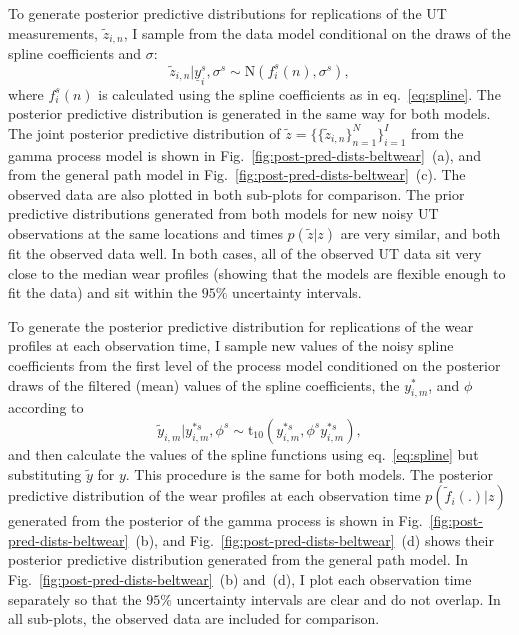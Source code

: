 To generate posterior predictive distributions for replications of the UT measurements, $\tilde{z}_{i,n}$, I sample from the data model conditional on the draws of the spline coefficients and $\sigma$:
\begin{equation}
  \tilde{z}_{i, n}|\underline{y}_{i}^s, \sigma^s \sim \mbox{N}\left(f^s_i(n), \sigma^s\right),
\end{equation}
where $f^s_i(n)$ is calculated using the spline coefficients as in eq.~\ref{eq:spline}. The posterior predictive distribution is generated in the same way for both models. The joint posterior predictive distribution of $\tilde{z} = \{\{\tilde{z}_{i,n}\}^N_{n = 1}\}^I_{i = 1}$ from the gamma process model is shown in Fig.~\ref{fig:post-pred-dists-beltwear}~(a), and from the general path model in Fig.~\ref{fig:post-pred-dists-beltwear}~(c). The observed data are also plotted in both sub-plots for comparison. The prior predictive distributions generated from both models for new noisy UT observations at the same locations and times $p(\tilde{z}|z)$ are very similar, and both fit the observed data well. In both cases, all of the observed UT data sit very close to the median wear profiles (showing that the models are flexible enough to fit the data) and sit within the $95\%$ uncertainty intervals. 

To generate the posterior predictive distribution for replications of the wear profiles at each observation time, I sample new values of the noisy spline coefficients from the first level of the process model conditioned on the posterior draws of the filtered (mean) values of the spline coefficients, the $y^{*}_{i, m}$, and $\phi$ according to
\begin{equation}
  \tilde{y}_{i, m}|y^{*s}_{i, m}, \phi^s \sim \mbox{t}_{10} (y^{*s}_{i, m}, \phi^s y^{*s}_{i, m}),
\end{equation}
and then calculate the values of the spline functions using eq.~\eqref{eq:spline} but substituting $\tilde{y}$ for $y$. This procedure is the same for both models. The posterior predictive distribution of the wear profiles at each observation time $p(\tilde{f}_i(.)|z)$ generated from the posterior of the gamma process is shown in Fig.~\ref{fig:post-pred-dists-beltwear}~(b), and Fig.~\ref{fig:post-pred-dists-beltwear}~(d) shows their posterior predictive distribution generated from the general path model. In Fig.~\ref{fig:post-pred-dists-beltwear}~(b) and~(d), I plot each observation time separately so that the $95\%$ uncertainty intervals are clear and do not overlap. In all sub-plots, the observed data are included for comparison.

